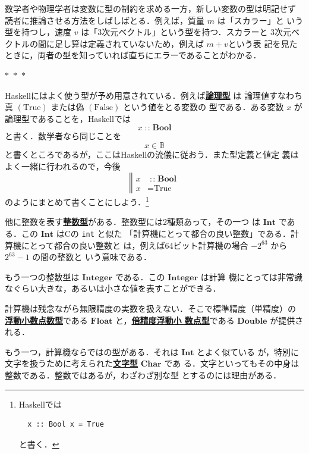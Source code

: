 \documentclass[a5paper,twoside,fleqn]{jsbook}
\newcommand{\separator}{\begin{center}$*$~$*$~$*$\end{center}}
\newcommand{\programminglanguage}[1]{\textsf{#1}}
\newcommand{\clang}{\programminglanguage{C}}
\newcommand{\haskell}{\programminglanguage{Haskell}}
\newcommand{\keyword}[1]{{\underline{\textbf{#1}}}}
\newcommand{\code}[1]{\texttt{#1}}
\newcommand{\mBrace}{\Vert}
\newcommand{\mSpecialConstant}[1]{\textrm{#1}} %
\newcommand{\mFalse}{\mSpecialConstant{False}}
\newcommand{\mTrue}{\mSpecialConstant{True}}
\DeclareMathOperator{\mIn}{{:\!:}}
\newcommand{\mSpecialSet}[1]{\mathbb{#1}} %
\newcommand{\mBSet}{\mSpecialSet{B}}
\newcommand{\mType}[1]{\mathbf{#1}}
\newcommand{\mBoolType}{\mType{Bool}}
\newcommand{\mCharType}{\mType{Char}}
\newcommand{\mFloatType}{\mType{Float}}
\newcommand{\mDoubleType}{\mType{Double}}
\newcommand{\mIntType}{\mType{Int}}
\newcommand{\mIntegerType}{\mType{Integer}}
\begin{document}
数学者や物理学者は変数に型の制約を求める一方，新しい変数の型は明記せず
読者に推論させる方法をしばしばとる．例えば，質量 $m$ は「スカラー」と
いう型を持つし，速度 $v$ は「3次元ベクトル」という型を持つ．スカラーと
3次元ベクトルの間に足し算は定義されていないため，例えば $m+v$という表
記を見たときに，両者の型を知っていれば直ちにエラーであることがわかる．

\separator

\haskell にはよく使う型が予め用意されている．例えば\keyword{論理型} は
論理値すなわち真 $(\mTrue)$ または偽 $(\mFalse)$ という値をとる変数の
型である．ある変数 $x$ が論理型であることを，\haskell では
\begin{equation}
x\mIn\mBoolType
\end{equation}
と書く．数学者なら同じことを
\begin{equation}
x\in\mBSet
\end{equation}
と書くところであるが，ここは\haskell の流儀に従おう．また型定義と値定
義はよく一緒に行われるので，今後
\begin{equation}
\left\mBrace\begin{aligned} x&\mIn\mBoolType\\ x&=\mTrue
\end{aligned}\right.
\end{equation}
のようにまとめて書くことにしよう．\footnote{\haskell では
\begin{verbatim}
  x :: Bool x = True
\end{verbatim}
と書く．}

他に整数を表す\keyword{整数型}がある．整数型には2種類あって，その一つ
は $\mIntType$ である．この $\mIntType$ は\clang の \code{int} と似た
「計算機にとって都合の良い整数」である．計算機にとって都合の良い整数と
は，例えば64ビット計算機の場合 $-2^{63}$ から $2^{63}-1$ の間の整数と
いう意味である．

もう一つの整数型は $\mIntegerType$ である．この $\mIntegerType$ は計算
機にとっては非常識なぐらい大きな，あるいは小さな値を表すことができる．

計算機は残念ながら無限精度の実数を扱えない．そこで標準精度（単精度）の
\keyword{浮動小数点数型}である $\mFloatType$ と，\keyword{倍精度浮動小
  数点型}である $\mDoubleType$ が提供される．

もう一つ，計算機ならではの型がある．それは $\mIntType$ とよく似ている
が，特別に文字を扱うために考えられた\keyword{文字型} $\mCharType$ であ
る．文字といってもその中身は整数である．整数ではあるが，わざわざ別な型
とするのには理由がある．
\end{document}
